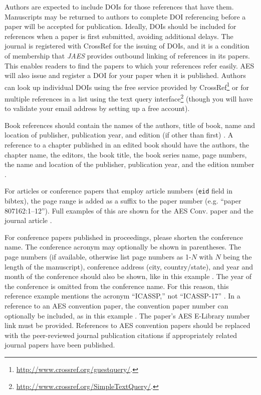 \documentclass[fleqn,draft]{jaes}
\begin{document}
Authors are expected to include DOIs for those references that have them. Manuscripts may be returned to authors to complete DOI referencing before a paper will be accepted for publication. Ideally, DOIs should be included for references when a paper is first submitted, avoiding additional delays. The journal is registered with CrossRef for the issuing of DOIs, and it is a condition of membership that \textit{JAES} provides outbound linking of references in its papers. This enables readers to find the papers to which your references refer easily. AES will also issue and register a DOI for your paper when it is published. Authors can look up individual DOIs using the free service provided by CrossRef\footnote{\url{http://www.crossref.org/guestquery/}.} or for multiple references in a list using the text query interface\footnote{\url{http://www.crossref.org/SimpleTextQuery/}.} (though you will have to validate your email address by setting up a free account).

Book references should contain the names of the authors, title of book, name and location of publisher, publication year, and edition (if other than first) \cite{a_book_ref, a_book_ref_2nd_edition}. A reference to a chapter published in an edited book should have the authors, the chapter name, the editors, the book title, the book series name, page numbers, the name and location of the publisher, publication year, and the edition number \cite{a_book_chapter}. 

For articles or conference papers that employ article numbers (\texttt{eid} field in bibtex), the page range is added as a suffix to the paper number (e.g. ``paper 807162:1–12''). Full examples of this are shown for the AES Conv. paper \cite{AES_convention_paper} and the journal article \cite{a_journal_paper_with_article_ID}.

For conference papers published in proceedings, please shorten the conference name. The conference acronym may optionally be shown in parentheses. The page numbers (if available, otherwise list page numbers as 1-$N$ with $N$ being the length of the manuscript), conference address (city, country/state), and year and month of the conference should also be shown, like in this example \cite{a_nonAESconference_paper}. The year of the conference is omitted from the conference name. For this reason, this reference example mentions the acronym ``ICASSP,'' not ``ICASSP-17'' \cite{a_nonAESconference_paper}. 
In a reference to an AES convention paper, the convention paper number can optionally be included, as in this example \cite{AES_convention_paper}. The paper's AES E-Library number link must be provided. References to AES convention papers should be replaced with the peer-reviewed journal publication citations if appropriately related journal papers have been published.
\end{document}
